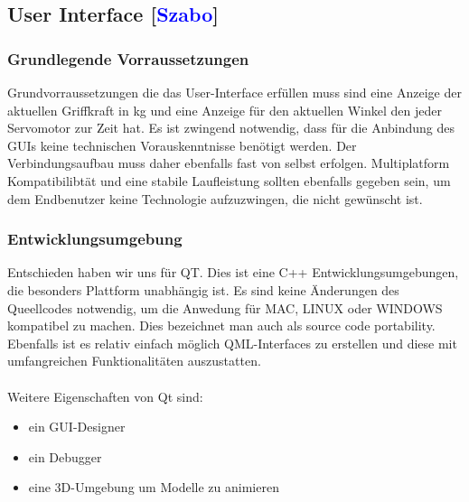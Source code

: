 \documentclass[titlepage,12pt,twoside]{article}
\begin{document}
\newpage
\subsection{User Interface [\textcolor{blue}{Szabo}]}
\label{chap:User Interface}

\subsubsection{Grundlegende Vorraussetzungen}
Grundvorraussetzungen die das User-Interface erfüllen muss sind eine Anzeige der aktuellen Griffkraft in kg und eine Anzeige für
den aktuellen Winkel den jeder Servomotor zur Zeit hat. Es ist zwingend notwendig, dass für die Anbindung des GUIs keine technischen
Vorauskenntnisse benötigt werden. Der Verbindungsaufbau muss daher ebenfalls fast von selbst erfolgen. Multiplatform Kompatibilibtät
und eine stabile Laufleistung sollten ebenfalls gegeben sein, um dem Endbenutzer keine Technologie aufzuzwingen, die nicht gewünscht ist.

\subsubsection{Entwicklungsumgebung}

Entschieden haben wir uns für QT. Dies ist eine C++ Entwicklungsumgebungen, die besonders Plattform unabhängig ist. Es sind keine Änderungen
des Queellcodes notwendig, um die Anwedung für MAC, LINUX oder WINDOWS kompatibel zu machen. Dies bezeichnet man auch als source 
code portability. Ebenfalls ist es relativ einfach möglich QML-Interfaces zu erstellen und diese mit umfangreichen Funktionalitäten auszustatten. \\
\\ 
Weitere Eigenschaften von Qt sind:
\begin{itemize}
	\item ein GUI-Designer
	\item ein Debugger
	\item eine 3D-Umgebung um Modelle zu animieren
\end{itemize}
\end{document}
